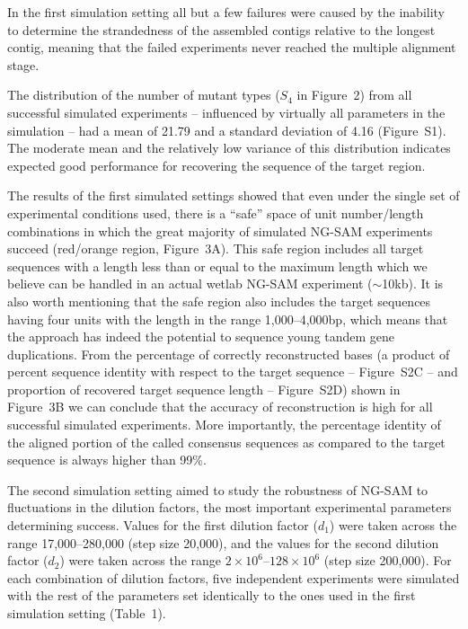 \documentclass[10pt]{article}
\newcommand{\blue}[1]{{\color{blue} #1}}
\begin{document}
In the first simulation setting all but a few failures were caused by the inability to determine the strandedness of the assembled contigs relative to the longest contig, meaning that the failed experiments never reached the multiple alignment stage.

The distribution of the number of mutant types ($S_4$ in Figure~2) from all successful simulated experiments -- influenced by virtually all parameters in the simulation -- had a mean of 21.79 and a standard deviation of 4.16 (Figure~S1). The moderate mean and the relatively low variance of this distribution indicates expected good performance for recovering the sequence of the target region.

The results of the first simulated settings showed that even under the single set of experimental conditions used, there is a ``safe'' space of unit number/length combinations in which the great majority of simulated NG-SAM experiments succeed (red/orange region, Figure~3A). This safe region includes all target sequences with a length \blue{less than or equal to} the maximum length which we believe can be handled in an actual wetlab NG-SAM experiment ($\sim$10kb). It is also worth mentioning that the safe region also includes the target sequences having four units with the length in the range 1,000--4,000bp, which means that the approach has indeed the potential to sequence young tandem gene duplications.
From the percentage of correctly reconstructed bases (a product of  percent sequence identity with respect to the target sequence -- Figure~S2C -- and proportion of recovered target sequence length -- Figure~S2D) shown in Figure~3B \blue{we can conclude} that the accuracy of  reconstruction is high for all successful simulated experiments. More importantly, the \blue{percentage} identity of the aligned portion of the called consensus sequences as compared to the target sequence is always higher than 99\%.

The second simulation setting aimed to study the robustness of NG-SAM to fluctuations in the dilution factors, the most important experimental parameters determining success. Values for the first dilution factor ($d_1$) were taken across the range 17,000--280,000 (step size 20,000), and the values for the second dilution factor  ($d_2$) were taken across the range $2\times 10^6$--$128\times 10^6$ (step size 200,000). For each combination of dilution factors, five independent experiments were simulated with the rest of the parameters set \blue{identically} to the ones used in the first simulation setting (Table~1).
\end{document}

